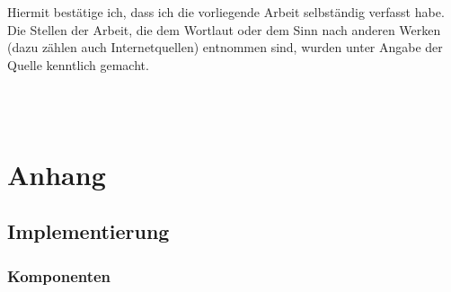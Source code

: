 \documentclass[biblatex]{lni}
\begin{document}
\vspace{1cm}

\noindent
Hiermit bestätige ich,
dass ich die vorliegende Arbeit selbständig verfasst habe.
Die Stellen der Arbeit, die dem Wortlaut oder dem Sinn nach anderen Werken (dazu zählen auch Internetquellen) entnommen sind,
wurden unter Angabe der Quelle kenntlich gemacht.

\vspace{3cm}

\noindent
{} \hfill \makebox[5cm][c]{} \\
\makebox[5cm]{\hrulefill} \hfill \makebox[5cm]{\hrulefill} \\
 \hfill {}

\newpage

\printbibliography

\newpage


\section{Anhang}
\label{sec:anhang}
\subsection{Implementierung}

\subsubsection{Komponenten}
\end{document}
